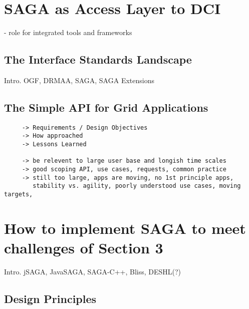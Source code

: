 \documentclass[a4paper,10pt]{article}
\begin{document}
\section{SAGA as Access Layer to DCI}

 - role for integrated tools and frameworks


 \subsection{The Interface Standards Landscape}
 \label{interface_landscape}

  Intro. OGF, DRMAA, SAGA, SAGA Extensions\\

 \subsection{The Simple API for Grid Applications}

  \begin{verbatim}
     -> Requirements / Design Objectives
     -> How approached
     -> Lessons Learned
  
     -> be relevent to large user base and longish time scales
     -> good scoping API, use cases, requests, common practice
     -> still too large, apps are moving, no 1st principle apps,
        stability vs. agility, poorly understood use cases, moving targets, 

  \end{verbatim}





\section{How to implement SAGA to meet challenges of Section 3}
\label{saga_impls}

 Intro. jSAGA, JavaSAGA, SAGA-C++, Bliss, DESHL(?)

 \subsection{Design Principles}
\end{document}
